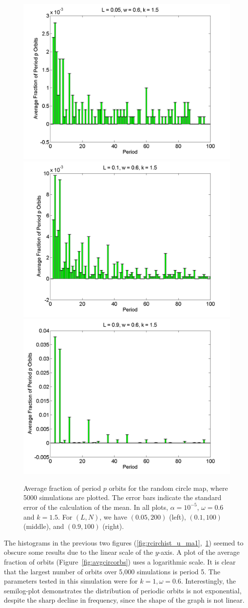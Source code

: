 \begin{figure}[H]\linespread{1}
\caption[Average fraction of period $p$ orbits for the random circle
map (uniform distribution), for $\alpha=10^{-5}$, $\omega=0.6$ and $k=1.5$]{Average fraction of period $p$ orbits for the random circle
map, where 5000 simulations are plotted. The error bars indicate
the standard error of the calculation of the mean. In all plots,
$\alpha = 10^{-5}$, $\omega=0.6$ and $k=1.5$. For $(L,N)$,
we have $(0.05, 200)$ (left), $(0.1, 100)$
(middle), and $(0.9, 100)$ (right).}\label{fig:rcirchist_u_ma2}
	\begin{center}	\includegraphics[width=.33\textwidth]{figs/rcirc_hist_u_L_005_w_06_k_15_sims_5000.png}\hfill
\includegraphics[width=.33\textwidth]{figs/rcirc_hist_u_L_01_w_06_k_15_sims_5000.png}\hfill
\includegraphics[width=.33\textwidth]{figs/rcirc_hist_u_L_09_w_06_k_15_sims_5000.png}
	\end{center}
\end{figure}

The histograms in the previous two
figures (\ref{fig:rcirchist_u_ma1},~\ref{fig:rcirchist_u_ma2}) seemed
to obscure some results due to the linear scale of the $y$-axis. A plot of the average fraction of orbits
(Figure~\ref{fig:avgcircorbs}) uses a logarithmic scale. It is clear
that the largest number of orbits over 5,000
simulations is period 5. The parameters tested in this simulation were
for $k=1, \omega=0.6$. Interestingly, the
semilog-plot demonstrates the distribution of periodic orbits is not
exponential, despite the sharp decline in frequency, since the shape of the graph is not linear.
 
